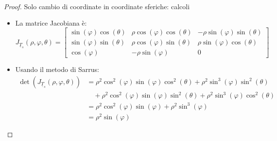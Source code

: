 \documentclass[12pt, a4paper]{article}
\theoremstyle{break}
\begin{document}
\begin{proof} Solo cambio di coordinate in coordinate sferiche: calcoli
	\begin{itemize}
		\item La matrice Jacobiana è:
			\[
				J_{\underline{T}_s} (\rho, \varphi, \theta) =
				\begin{bmatrix}
					\sin(\varphi) \cos(\theta) & \rho \cos(\varphi) \cos(\theta)
					                           & -\rho \sin(\varphi)
					\sin(\theta)
					\\ \sin(\varphi) \sin(\theta)& \rho \cos(\varphi)
					\sin(\theta)               & \rho \sin(\varphi) \cos(\theta)
					\\ \cos(\varphi) & -\rho \sin(\varphi)              & 0
				\end{bmatrix}
			\]
		\item Usando il metodo di Sarrus:
			\begin{align*}
				\det(J_{\underline{T}_s} (\rho, \varphi, \theta)) & =
				\rho^2 \cos^2(\varphi) \sin(\varphi) \cos^2(\theta) +
				\rho^2 \sin^3(\varphi) \sin^2(\theta)
				\\ & \quad + \rho^2 \cos^2(\varphi) \sin(\varphi) \sin^2(\theta)
				+ \rho^2 \sin^3(\varphi) \cos^2(\theta)
				\\ &= \rho^2 \cos^2(\varphi) \sin(\varphi) +
				\rho^2 \sin^3(\varphi)
				\\ &= \rho^2 \sin(\varphi)
			\end{align*}
	\end{itemize}
\end{proof}
\end{document}
